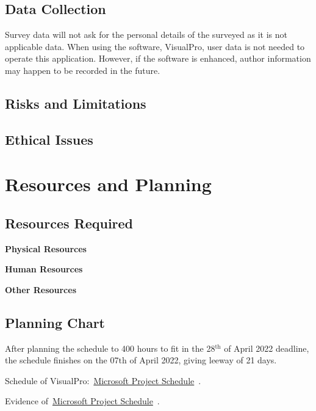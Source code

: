 \documentclass[conference]{IEEEtran}
\begin{document}
      \subsection{Data Collection}
        Survey data will not ask for the personal details of the surveyed as it is not applicable data. When using the software, VisualPro, user data is not needed to operate this application. However, if the software is enhanced, author information may happen to be recorded in the future.

      \subsection{Risks and Limitations}
        
      \subsection{Ethical Issues}
    \section{Resources and Planning}
    \label{sec: resourcesPlanning}
      \subsection{Resources Required}
        \textbf{Physical Resources}

        \textbf{Human Resources}

        \textbf{Other Resources}

      \subsection{Planning Chart}
      \label{subsec:rp-planningChart}
        After planning the schedule to 400 hours to fit in the 28$^{\text{th}}$ of April 2022 deadline, the schedule finishes on the 07${\text{th}}$ of April 2022, giving leeway of 21 days. 

        Schedule of VisualPro:~\href{https://github.com/ShinkuKira21/VisualPro-FinalProject/blob/main/Project/VisualPro.mpp?raw=true}{Microsoft Project Schedule}~\cite{patch_visualpro_2021}.
        
        Evidence of~\href{https://github.com/ShinkuKira21/VisualPro-FinalProject/blob/main/Project/Plan.docx?raw=true}{Microsoft Project Schedule}~\cite{patch_visualpro_2021-1}.
\end{document}
